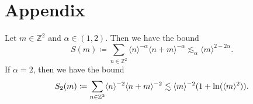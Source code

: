 \section{Appendix}

\begin{lemma}\label{lemma:conv_ineq}
    Let $m \in \mathbb{Z}^2$ and $\alpha \in (1, 2)$. Then we have the bound
    \begin{equation*}
        S(m) \coloneqq \sum_{n \in \mathbb{Z}^2} \langle n \rangle^{-\alpha} \langle n + m \rangle^{-\alpha} \lesssim_\alpha \langle m \rangle^{2-2\alpha}.
    \end{equation*}
    If $\alpha = 2$, then we have the bound
    \begin{align*}
        S_2(m) \coloneqq \sum_{n \in \mathbb{Z}^2} \langle n \rangle^{-2} \langle n + m \rangle^{-2} \lesssim \langle m\rangle^{-2} (1+\ln(\langle m\rangle^2)).
    \end{align*}
\end{lemma}

